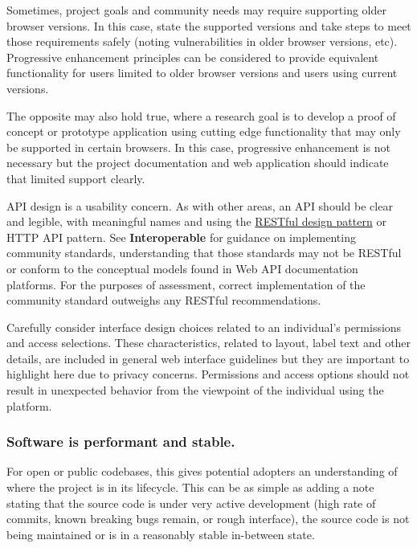 \documentclass{article}
\newcounter{subsubsubsection}[subsubsection]
\begin{document}
Sometimes, project goals and community needs may require supporting older browser versions. In this case, state the supported versions and take steps to meet those requirements safely (noting vulnerabilities in older browser versions, etc). Progressive enhancement principles can be considered to provide equivalent functionality for users limited to older browser versions and users using current versions.
 
The opposite may also hold true, where a research goal is to develop a proof of concept or prototype application using cutting edge functionality that may only be supported in certain browsers. In this case, progressive enhancement is not necessary but the project documentation and web application should indicate that limited support clearly.

API design is a usability concern. As with other areas, an API should be clear and legible, with meaningful names and using the \href{https://www.ics.uci.edu/~fielding/pubs/dissertation/top.htm} {RESTful design pattern} \autocite{fielding_architectural_2000} or HTTP API pattern. See \textbf{Interoperable} for guidance on implementing community standards, understanding that those standards may not be RESTful or conform to the conceptual models found in Web API documentation platforms. For the purposes of assessment, correct implementation of the community standard outweighs any RESTful recommendations.

Carefully consider interface design choices related to an individual’s permissions and access selections. These characteristics, related to layout, label text and other details, are included in general web interface guidelines but they are important to highlight here due to privacy concerns. Permissions and access options should not result in unexpected behavior from the viewpoint of the individual using the platform. 

\subsubsection{Software is performant and stable.}
For open or public codebases, this gives potential adopters an understanding of where the project is in its lifecycle. This can be as simple as adding a note stating that the source code is under very active development (high rate of commits, known breaking bugs remain, or rough interface), the source code is not being maintained or is in a reasonably stable in-between state.
 
\end{document}
